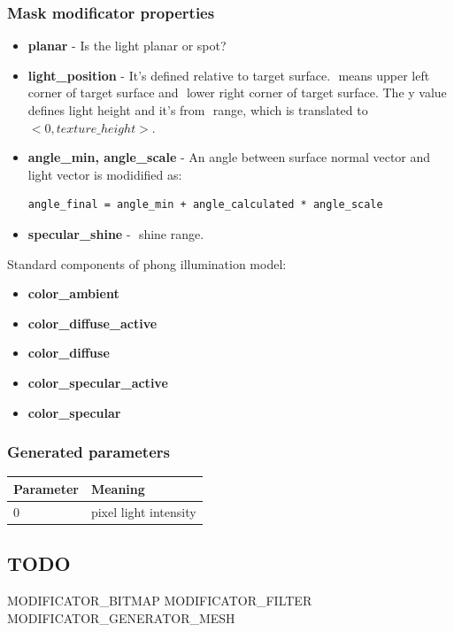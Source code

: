 \documentclass[9pt]{article}
\begin{document}
\subsubsection*{Mask modificator properties}
\begin{itemize}
\item{\bf planar} - Is the light planar or spot?
\item{\bf light\_position} - It's defined relative to target surface. 
\begin{math}<-1,y,-1>\end{math} means upper left corner of target surface and \begin{math}<1,y,1>\end{math} lower right
corner of target surface. The y value defines light height and it's from \begin{math}<0,1>\end{math} range, 
which is translated to \begin{math}<0,texture\_height>\end{math}.
\item{\bf angle\_min, angle\_scale} - An angle between surface normal vector and light vector
is modidified as:
\begin{verbatim}
angle_final = angle_min + angle_calculated * angle_scale
\end{verbatim}
\item{\bf specular\_shine} - \begin{math}<0,1>\end{math} shine range.
\end{itemize}
Standard components of phong illumination model:
\begin{itemize}
\item{\bf color\_ambient}
\item{\bf color\_diffuse\_active}
\item{\bf color\_diffuse}
\item{\bf color\_specular\_active}
\item{\bf color\_specular}
\end{itemize}
\subsubsection*{Generated parameters}
\begin{tabular}{|l||l|}
\hline
  Parameter & Meaning \\
\hline  
  0 & pixel light intensity \\
\hline
\end{tabular}

\subsection{TODO}
MODIFICATOR\_BITMAP
MODIFICATOR\_FILTER
MODIFICATOR\_GENERATOR\_MESH
\end{document}
